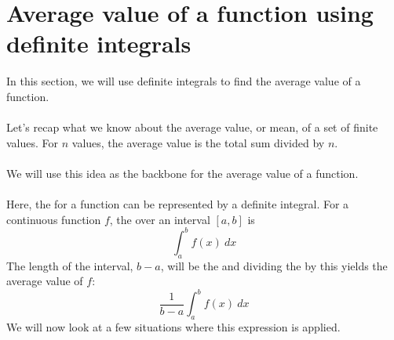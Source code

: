 \documentclass[11pt]{scrartcl}
\begin{document}
\maketitle
\noindent 

\section{Average value of a function using definite integrals}
\noindent
In this section, we will use definite integrals to find the average value of a function. \\
\\
\noindent 
Let's recap what we know about the average value, or mean, of a set of finite values. For $n$ values, the average value is the total sum divided by $n$. \\
\\
\noindent 
We will use this idea as the backbone for the average value of a function. \\
\\
\noindent 
Here, the  for a function can be represented by a definite integral. For a continuous function $f$, the  over an interval $[a,b]$ is 
$$\int_{a}^{b} f(x) \ dx$$
The length of the interval, $b-a$, will be the  and dividing the  by this yields the average value of $f$: 
$$\frac{1}{b-a}\int_{a}^{b} f(x) \ dx$$ 
\noindent 
We will now look at a few situations where this expression is applied. 
\end{document}
